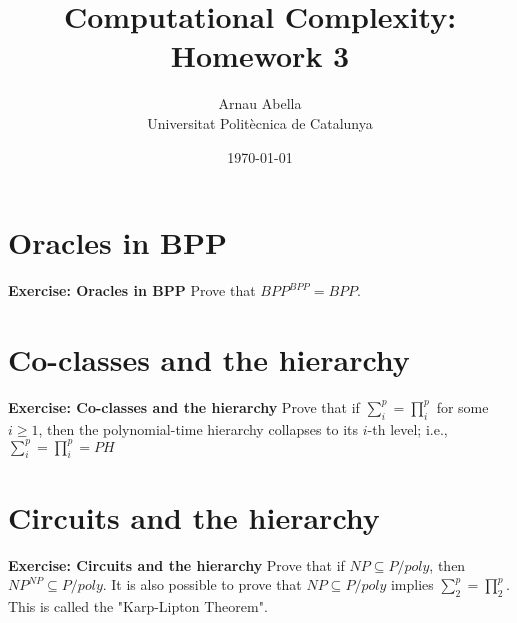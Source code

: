 \documentclass[12pt, a4paper]{article} %
\title{%
  Computational Complexity: Homework 3
}
\author{%
  Arnau Abella \\
  \large{Universitat Polit\`ecnica de Catalunya}
}
\date{\today}
\begin{document}
\maketitle


\section{Oracles in BPP}

\textbf{Exercise: Oracles in BPP} \quad Prove that ${BPP}^{BPP} = BPP$.


\newpage

\section{Co-classes and the hierarchy}

\textbf{Exercise: Co-classes and the hierarchy} \quad Prove that if $\sum_i^p = \prod_i^p$ for some $i \geq 1$, then the polynomial-time hierarchy collapses to its $i$-th level; i.e., $\sum_i^p = \prod_i^p = PH$


\newpage

\section{Circuits and the hierarchy}

\textbf{Exercise: Circuits and the hierarchy} \quad Prove that if $NP \subseteq P/poly$, then $NP^{NP} \subseteq P/poly$. It is also possible to prove that $NP \subseteq P/poly$ implies $\sum_2^p = \prod_2^p$. This is called the "Karp-Lipton Theorem".
\end{document}

